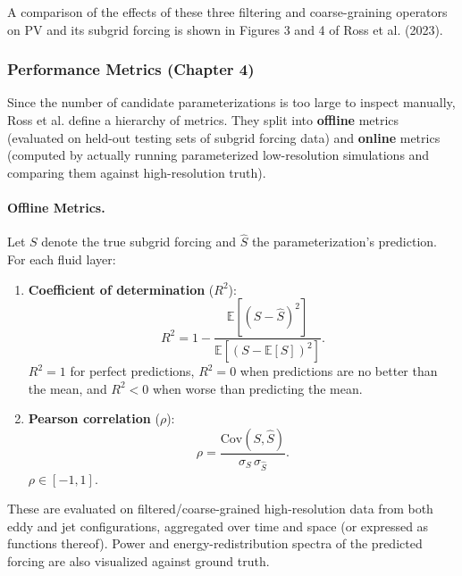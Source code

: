 \documentclass[../SQG_notes.tex]{subfiles}
\begin{document}
    \begin{remark}
        A comparison of the effects of these three filtering and coarse-graining operators on PV and its subgrid forcing is shown in Figures 3 and 4 of Ross et al. (2023).
    \end{remark}

    \subsubsection{Performance Metrics (Chapter 4)}
    Since the number of candidate parameterizations is too large to inspect manually, Ross et al. define a hierarchy of metrics. They split into \textbf{offline} metrics (evaluated on held-out testing sets of subgrid forcing data) and \textbf{online} metrics (computed by actually running parameterized low-resolution simulations and comparing them against high-resolution truth).

    \paragraph{Offline Metrics.} Let $S$ denote the true subgrid forcing and $\hat{S}$ the parameterization's prediction. For each fluid layer:
    \begin{enumerate}
        \item \textbf{Coefficient of determination} ($R^2$):
        \begin{equation}
            R^2 = 1 - \frac{\mathbb{E}\!\left[(S - \hat{S})^2\right]}{\mathbb{E}\!\left[(S - \mathbb{E}[S])^2\right]}.
        \end{equation}
        $R^2 = 1$ for perfect predictions, $R^2 = 0$ when predictions are no better than the mean, and $R^2 < 0$ when worse than predicting the mean.

        \item \textbf{Pearson correlation} ($\rho$):
        \begin{equation}
            \rho = \frac{\mathrm{Cov}(S, \hat{S})}{\sigma_S \, \sigma_{\hat{S}}}.
        \end{equation}
        $\rho \in [-1, 1]$. 
    \end{enumerate}
    These are evaluated on filtered/coarse-grained high-resolution data from both eddy and jet configurations, aggregated over time and space (or expressed as functions thereof). Power and energy-redistribution spectra of the predicted forcing are also visualized against ground truth.
\end{document}
